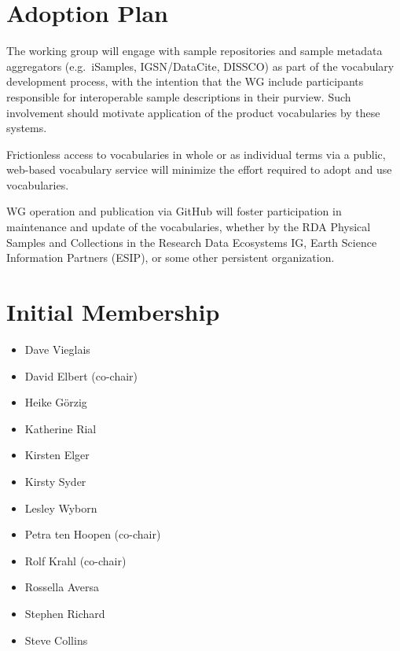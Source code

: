 \documentclass{scrartcl}
\begin{document}
\section{Adoption Plan}

The working group will engage with sample repositories and sample
metadata aggregators (e.g.\ iSamples, IGSN/DataCite, DISSCO) as part
of the vocabulary development process, with the intention that the WG
include participants responsible for interoperable sample descriptions
in their purview.  Such involvement should motivate application of the
product vocabularies by these systems.

Frictionless access to vocabularies in whole or as individual terms
via a public, web-based vocabulary service will minimize the effort
required to adopt and use vocabularies.

WG operation and publication via GitHub will foster participation in
maintenance and update of the vocabularies, whether by the RDA
Physical Samples and Collections in the Research Data Ecosystems IG,
Earth Science Information Partners (ESIP), or some other persistent
organization.

\section{Initial Membership}

\begin{itemize}
\item Dave Vieglais
\item David Elbert (co-chair)
\item Heike Görzig
\item Katherine Rial
\item Kirsten Elger
\item Kirsty Syder
\item Lesley Wyborn
\item Petra ten Hoopen (co-chair)
\item Rolf Krahl (co-chair)
\item Rossella Aversa
\item Stephen Richard
\item Steve Collins
\end{itemize}
\end{document}

